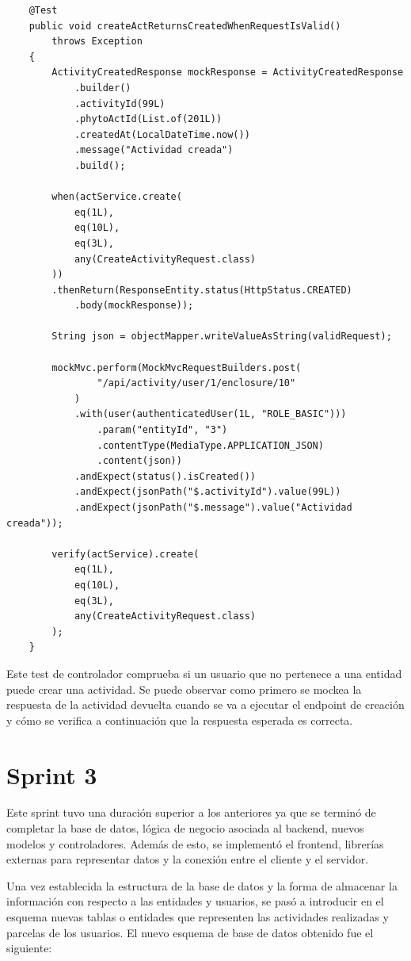 \begin{verbatim}
    @Test
    public void createActReturnsCreatedWhenRequestIsValid() 
        throws Exception 
    {
        ActivityCreatedResponse mockResponse = ActivityCreatedResponse
            .builder()
            .activityId(99L)
            .phytoActId(List.of(201L))
            .createdAt(LocalDateTime.now())
            .message("Actividad creada")
            .build();
    
        when(actService.create(
            eq(1L), 
            eq(10L), 
            eq(3L),
            any(CreateActivityRequest.class)
        ))
        .thenReturn(ResponseEntity.status(HttpStatus.CREATED)
            .body(mockResponse));
    
        String json = objectMapper.writeValueAsString(validRequest);
    
        mockMvc.perform(MockMvcRequestBuilders.post(
                "/api/activity/user/1/enclosure/10"
            )
            .with(user(authenticatedUser(1L, "ROLE_BASIC")))
                .param("entityId", "3")
                .contentType(MediaType.APPLICATION_JSON)
                .content(json))
            .andExpect(status().isCreated())
            .andExpect(jsonPath("$.activityId").value(99L))
            .andExpect(jsonPath("$.message").value("Actividad creada"));
    
        verify(actService).create(
            eq(1L), 
            eq(10L), 
            eq(3L), 
            any(CreateActivityRequest.class)
        );
    }
\end{verbatim}

Este test de controlador comprueba si un usuario que no pertenece a una entidad puede crear una actividad. Se puede observar como primero se mockea la respuesta de la actividad devuelta cuando se va 
a ejecutar el endpoint de creación y cómo se verifica a continuación que la respuesta esperada es correcta.

\section{Sprint 3}

Este sprint tuvo una duración superior a los anteriores ya que se terminó de completar la base de datos, lógica de negocio asociada al backend, nuevos modelos y controladores. Además de esto, se 
implementó el frontend, librerías externas para representar datos y la conexión entre el cliente y el servidor.

Una vez establecida la estructura de la base de datos y la forma de almacenar la información con respecto a las entidades y usuarios, se pasó a introducir en el esquema nuevas tablas o entidades 
que representen las actividades realizadas y parcelas de los usuarios. El nuevo esquema de base de datos obtenido fue el siguiente:


